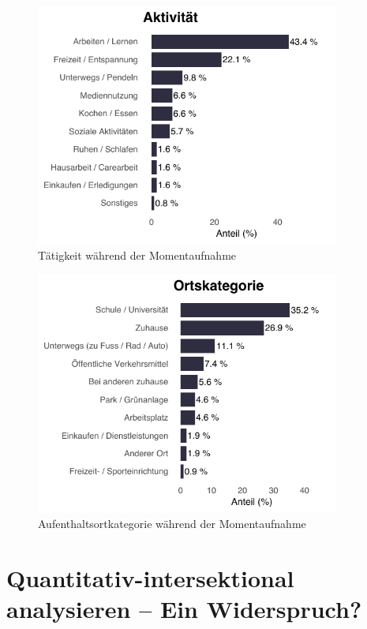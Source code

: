 \begin{figure}[h]
    \centering
    \includegraphics[width=10cm]{Analyse/Plots/cat_dist_activity.pdf}
    \caption{Tätigkeit während der Momentaufnahme}
    \label{fig:survey_activities}
\end{figure}

\begin{figure}[h]
    \centering
    \includegraphics[width=10cm]{Analyse/Plots/cat_dist_location_category.pdf}
    \caption{Aufenthaltsortkategorie während der Momentaufnahme}
    \label{fig:survey_locations}
\end{figure}


\section{Quantitativ-intersektional analysieren -- Ein Widerspruch?}

